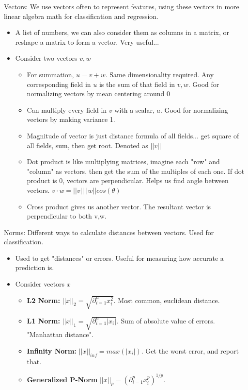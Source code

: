 \documentclass{article}
\begin{document}
Vectors: We use vectors often to represent features, using these vectors in more linear algebra math for classification and regression. 
\begin{itemize}
    \item A list of numbers, we can also consider them as columns in a matrix, or reshape a matrix to form a vector. Very useful...
    \item Consider two vectors $v,w$
    \begin{itemize}
        \item For summation, $u=v+w$. Same dimensionality required. Any corresponding field in $u$ is the sum of that field in $v,w$. Good for normalizing vectors by mean centering around 0
        \item Can multiply every field in $v$ with a scalar, $a$. Good for normalizing vectors by making variance 1.
        \item Magnitude of vector is just distance formula of all fields... get square of all fields, sum, then get root. Denoted as $||v||$
        \item Dot product is like multiplying matrices, imagine each "row" and "column" as vectors, then get the sum of the multiples of each one. If dot product is 0, vectors are perpendicular. Helps us find angle between vectors. $v \cdot w = ||v||||w||cos(\theta)$
        \item Cross product gives us another vector. The resultant vector is perpendicular to both v,w. 
    \end{itemize}
\end{itemize}
Norms: Different ways to calculate distances between vectors. Used for classification.
\begin{itemize}
    \item Used to get "distances" or errors. Useful for measuring how accurate a prediction is.
    \item Consider vectors $x$
    \begin{itemize}
        \item \textbf{L2 Norm:} $||x||_2 = \sqrt{\partial^n_{i=1}x_i^2}$. Most common, euclidean distance.
        \item \textbf{L1 Norm:} $||x||_1 = \sqrt{\partial^n_{i=1}|x_i|}$. Sum of absolute value of errors. "Manhattan distance".
        \item \textbf{Infinity Norm:} $||x||_{inf} = max(|x_i|)$. Get the worst error, and report that. 
        \item \textbf{Generalized P-Norm} $||x||_p = (\partial^n_{i=1}x_i^p)^{1/p}$.
    \end{itemize}
\end{itemize}
\end{document}
